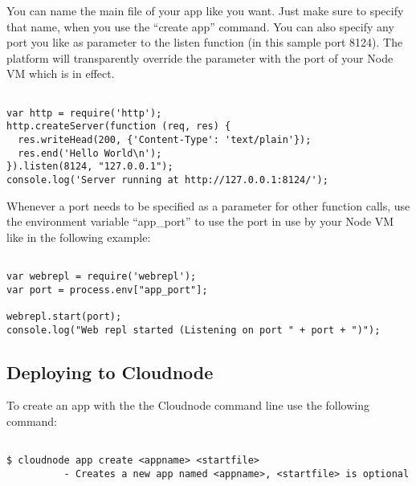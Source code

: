 You can name the main file of your app like you want. Just make sure to specify that name, when you use the ``create app'' command. You can also specify any port you like as parameter to the listen function (in this sample port 8124). The platform will transparently override the parameter with the port of your Node VM which is in effect. 

\begin{adjustwidth}{2.5em}{2.5em}
\begin{verbatim}

var http = require('http');
http.createServer(function (req, res) {
  res.writeHead(200, {'Content-Type': 'text/plain'});
  res.end('Hello World\n');
}).listen(8124, "127.0.0.1");
console.log('Server running at http://127.0.0.1:8124/');

\end{verbatim}
\end{adjustwidth}

Whenever a port needs to be specified as a parameter for other function calls, use the environment variable ``app\_port'' to use the port in use by your Node VM like in the following example:

\begin{adjustwidth}{2.5em}{2.5em}
\begin{verbatim}

var webrepl = require('webrepl');
var port = process.env["app_port"];

webrepl.start(port);
console.log("Web repl started (Listening on port " + port + ")");

\end{verbatim}
\end{adjustwidth}



\subsection{Deploying to Cloudnode}
\label{deployingtocloudnode}

To create an app with the the Cloudnode command line use the following command:

\begin{adjustwidth}{2.5em}{2.5em}
\begin{verbatim}

$ cloudnode app create <appname> <startfile> 
          - Creates a new app named <appname>, <startfile> is optional

\end{verbatim}
\end{adjustwidth}

